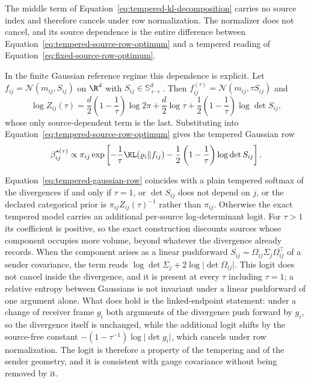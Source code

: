 The middle term of Equation~\eqref{eq:tempered-kl-decomposition} carries no source index and therefore cancels under row normalization. The normalizer does not cancel, and its source dependence is the entire difference between Equation~\eqref{eq:tempered-source-row-optimum} and a tempered reading of Equation~\eqref{eq:fixed-source-row-optimum}.

In the finite Gaussian reference regime this dependence is explicit. Let \(f_{ij}=\mathcal N(m_{ij},S_{ij})\) on \(\R^{d}\) with \(S_{ij}\in\mathbb S_{++}^{d}\). Then \(f_{ij}^{(\tau)}=\mathcal N(m_{ij},\tau S_{ij})\) and
\begin{equation}
\log Z_{ij}(\tau)
=\frac d2\left(1-\frac1\tau\right)\log 2\pi
+\frac d2\log\tau
+\frac12\left(1-\frac1\tau\right)\log\det S_{ij},
\label{eq:tempered-gaussian-normalizer}
\end{equation}
whose only source-dependent term is the last. Substituting into Equation~\eqref{eq:tempered-source-row-optimum} gives the tempered Gaussian row
\begin{equation}
\beta_{ij}^{\star(\tau)}
\propto
\pi_{ij}\exp\left[
-\frac{1}{\tau}\KL(\varrho_i\Vert f_{ij})
-\frac12\left(1-\frac1\tau\right)\log\det S_{ij}
\right].
\label{eq:tempered-gaussian-row}
\end{equation}

Equation~\eqref{eq:tempered-gaussian-row} coincides with a plain tempered softmax of the divergences if and only if \(\tau=1\), or \(\det S_{ij}\) does not depend on \(j\), or the declared categorical prior is \(\pi_{ij}Z_{ij}(\tau)^{-1}\) rather than \(\pi_{ij}\). Otherwise the exact tempered model carries an additional per-source log-determinant logit. For \(\tau>1\) its coefficient is positive, so the exact construction discounts sources whose component occupies more volume, beyond whatever the divergence already records. When the component arises as a linear pushforward \(S_{ij}=\Omega_{ij}\Sigma_j\Omega_{ij}^\top\) of a sender covariance, the term reads \(\log\det\Sigma_j+2\log\lvert\det\Omega_{ij}\rvert\). This logit does not cancel inside the divergence, and it is present at every \(\tau\) including \(\tau=1\); a relative entropy between Gaussians is not invariant under a linear pushforward of one argument alone. What does hold is the linked-endpoint statement: under a change of receiver frame \(g_i\) both arguments of the divergence push forward by \(g_i\), so the divergence itself is unchanged, while the additional logit shifts by the source-free constant \(-(1-\tau^{-1})\log\lvert\det g_i\rvert\), which cancels under row normalization. The logit is therefore a property of the tempering and of the sender geometry, and it is consistent with gauge covariance without being removed by it.

